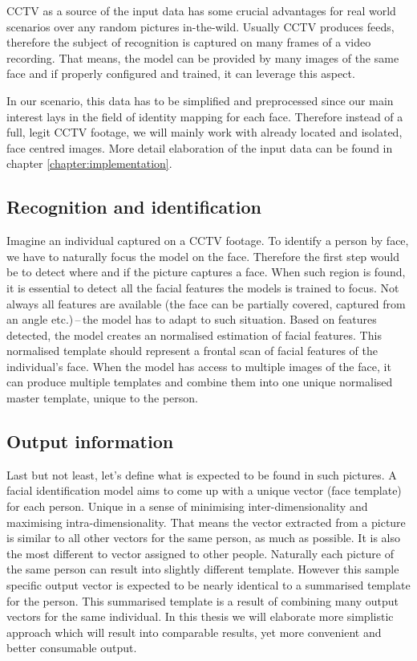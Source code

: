CCTV as a source of the input data has some crucial advantages for real world scenarios over any random pictures in-the-wild. Usually CCTV produces feeds, therefore the subject of recognition is captured on many frames of a video recording. That means, the model can be provided by many images of the same face and if properly configured and trained, it can leverage this aspect.

In our scenario, this data has to be simplified and preprocessed since our main interest lays in the field of identity mapping for each face. Therefore instead of a full, legit CCTV footage, we will mainly work with already located and isolated, face centred images. More detail elaboration of the input data can be found in chapter \ref{chapter:implementation}.

\subsection{Recognition and identification}

Imagine an individual captured on a CCTV footage. To identify a person by face, we have to naturally focus the model on the face. Therefore the first step would be to detect where and if the picture captures a face. When such region is found, it is essential to detect all the facial features the models is trained to focus. Not always all features are available (the face can be partially covered, captured from an angle etc.)\,--\,the model has to adapt to such situation. Based on features detected, the model creates an normalised estimation of facial features. This normalised template should represent a frontal scan of facial features of the individual's face. When the model has access to multiple images of the face, it can produce multiple templates and combine them into one unique normalised master template, unique to the person.

\subsection{Output information}

Last but not least, let's define what is expected to be found in such pictures. A facial identification model aims to come up with a unique vector (face template) for each person. Unique in a sense of minimising inter-dimensionality and maximising intra-dimensionality. That means the vector extracted from a picture is similar to all other vectors for the same person, as much as possible. It is also the most different to vector assigned to other people. Naturally each picture of the same person can result into slightly different template. However this sample specific output vector is expected to be nearly identical to a summarised template for the person. This summarised template is a result of combining many output vectors for the same individual. In this thesis we will elaborate more simplistic approach which will result into comparable results, yet more convenient and better consumable output.
